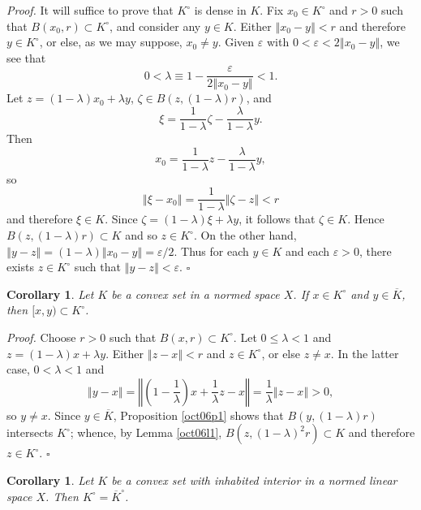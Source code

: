 \documentclass[11pt]{article}%
\newtheorem{corollary}[theorem]{Corollary}
\newenvironment{proof}[1][Proof]{\noindent\textit{#1.} }{}
\begin{document}
\begin{proof}
It will suffice to prove that $K^{\circ}$ is dense in $K$. Fix $x_{0}\in
K^{\circ}$ and $r>0$ such that $B(x_{0},r)\subset K^{\circ}$, and consider any
$y\in K$. Either $\left\Vert x_{0}-y\right\Vert <r$ and therefore $y\in
K^{\circ}$, or else, as we may suppose, $x_{0}\neq y$. Given $\varepsilon$
with $0<\varepsilon<2\left\Vert x_{0}-y\right\Vert $, we see that%
\[
0<\lambda\equiv1-\frac{\varepsilon}{2\left\Vert x_{0}-y\right\Vert }<1\text{.}%
\]
Let $z=(1-\lambda)x_{0}+\lambda y$, $\zeta\in B(z,\left(  1-\lambda\right)
r)$, and%
\[
\xi=\frac{1}{1-\lambda}\zeta-\frac{\lambda}{1-\lambda}y.
\]
Then%
\[
x_{0}=\frac{1}{1-\lambda}z-\frac{\lambda}{1-\lambda}y,
\]
so%
\[
\left\Vert \xi-x_{0}\right\Vert =\frac{1}{1-\lambda}\left\Vert \zeta
-z\right\Vert <r
\]
and therefore $\xi\in K$. Since $\zeta=(1-\lambda)\xi+\lambda y$, it follows
that $\zeta\in K$. Hence $B(z,(1-\lambda)r)\subset K$ and so $z\in K^{\circ}$.
On the other hand, $\left\Vert y-z\right\Vert =\left(  1-\lambda\right)
\left\Vert x_{0}-y\right\Vert =\varepsilon/2$. Thus for each $y\in K$ and each
$\varepsilon>0$, there exists $z\in K^{\circ}$ such that $\left\Vert
y-z\right\Vert <\varepsilon$.%
\hfill
$\square$
\end{proof}

\begin{corollary}
\label{oct06c1}Let $K$ be a convex set in a normed space $X$. If $x\in
K^{\circ}$ and $y\in\overline{K}$, then $[x,y)\subset K^{\circ}$.
\end{corollary}

\begin{proof}
Choose $r>0$ such that $B(x,r)\subset K^{\circ}$. Let $0\leq\lambda<1$ and
$z=\left(  1-\lambda\right)  x+\lambda y$. Either $\left\Vert z-x\right\Vert
<r$ and $z\in K^{\circ}$, or else $z\neq x$. In the latter case, $0<\lambda<1$
and%
\[
\left\Vert y-x\right\Vert =\left\Vert \left(  1-\frac{1}{\lambda}\right)
x+\frac{1}{\lambda}z-x\right\Vert =\frac{1}{\lambda}\left\Vert z-x\right\Vert
>0,
\]
so $y\neq x$. Since $y\in\overline{K}$, Proposition \ref{oct06p1} shows that
$B(y,\left(  1-\lambda\right)  r)$ intersects $K^{\circ}$; whence, by Lemma
\ref{oct06l1}, $B(z,\left(  1-\lambda\right)  ^{2}r)\subset K$ and therefore
$z\in K^{\circ}$.%
\hfill
$\square$
\end{proof}

\begin{corollary}
\label{oct07c2}Let $K$ be a convex set with inhabited interior in a normed
linear space $X$. Then $K^{\circ}=\overline{K}^{\circ}$.
\end{corollary}
\end{document}
